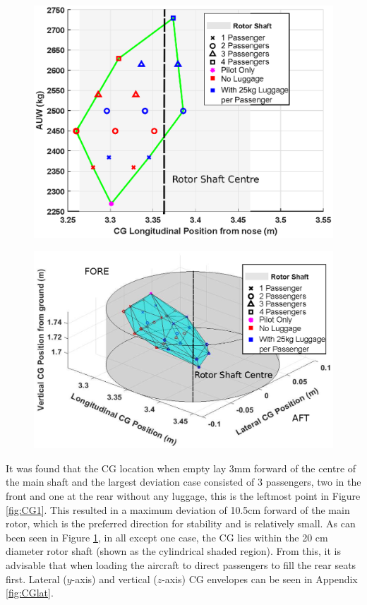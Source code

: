 \documentclass[11pt,a4paper]{article}
\begin{document}
\begin{figure}[H]
\centering
\begin{minipage}{.5\textwidth}
  \centering
  \includegraphics[width=\linewidth]{CGLONGVAUW.eps}
  \label{fig:CG1}
\end{minipage}%
\begin{minipage}{.5\textwidth}
  \centering
  \includegraphics[width=\linewidth]{CG3D2.eps}
  \label{fig:CG2}
\end{minipage}
\end{figure}

It was found that the CG location when empty lay 3mm forward of the centre of the main shaft and the largest deviation case consisted of 3 passengers, two in the front and one at the rear without any luggage, this is the leftmost point in Figure \ref{fig:CG1}. This resulted in a maximum deviation of 10.5cm forward of the main rotor, which is the preferred direction for stability and is relatively small\cite{prouty}. As can been seen in Figure \ref{fig:CG2}, in all except one case, the CG lies within the 20 cm diameter rotor shaft (shown as the cylindrical shaded region). From this, it is advisable that when loading the aircraft to direct passengers to fill the rear seats first. Lateral ($y$-axis) and vertical ($z$-axis) CG envelopes can be seen in Appendix \ref{fig:CGlat}.
\end{document}
